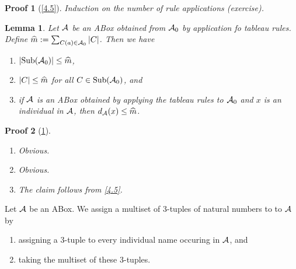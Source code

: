 \documentclass[openany]{scrbook}
\theoremstyle{break}
\newtheorem{Lemma}[Theorem]{Lemma}
\theoremstyle{nonumberbreak}
\theoremstyle{nonumberplain}
\theoremstyle{nonumberbreak}
\newtheorem{Proof}{Proof}
\newcommand{\then}{\Longrightarrow}
\newcommand{\abs}[2][]{\left|{#2}\right|\ifx#1\then\else_{#1}\fi}
\newcommand{\Sub}{\operatorname{Sub}}
\begin{document}
\begin{Proof}[\cref{4.5}]
  Induction on the number of rule applications (exercise).
\end{Proof}

\begin{Lemma}
  \label{4.6}
  Let ${\cal A}$ be an ABox obtained from ${\cal A}_0$ by application
  fo tableau rules. Define $\widehat{m} := \sum_{C(a) \in {\cal
      A}_0}{\abs{C}}$. Then we have
  \begin{enumerate}
  \item $\abs{\Sub({\cal A}_0)} \leq \widehat{m}$,
  \item $\abs{C} \leq \widehat{m}$ for all $C \in \Sub({\cal A}_0)$, and
  \item if ${\cal A}$ is an ABox obtained by applying the tableau
    rules to ${\cal A}_0$ and $x$ is an individual in ${\cal A}$, then
    $d_{\cal A}(x) \leq \widehat{m}$.
  \end{enumerate}
\end{Lemma}

\begin{Proof}[\cref{4.6}]
  \begin{enumerate}
  \item Obvious.
  \item Obvious.
  \item The claim follows from \cref{4.5}.
  \end{enumerate}
\end{Proof}

Let ${\cal A}$ be an ABox. We assign a multiset of 3-tuples of natural
numbers to to ${\cal A}$ by
\begin{enumerate}
\item assigning a 3-tuple to every individual name occuring in
  ${\cal A}$, and
\item taking the multiset of these 3-tuples.
\end{enumerate}
\end{document}
